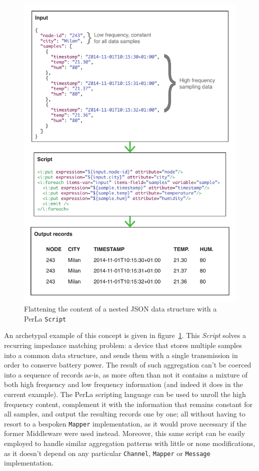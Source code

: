 \begin{figure}[h!]
    \centering
    \includegraphics[scale=0.8]{imgs/script_unrolling.pdf}
    \caption{Flattening the content of a nested JSON data structure with a
    PerLa \texttt{Script}}
    \label{fig:script_unrolling}
\end{figure}

An archetypal example of this concept is given in
figure~\ref{fig:script_unrolling}. This \textit{Script} solves a recurring
impedance matching problem: a device that stores multiple samples into a common
data structure, and sends them with a single transmission in order to conserve
battery power. The result of such aggregation can't be coerced into a sequence
of records as-is, as more often than not it contains a mixture of both high
frequency and low frequency information (and indeed it does in the current
example). The PerLa scripting language can be used to unroll the high frequency
content, complement it with the information that remains constant for all
samples, and output the resulting records one by one; all without having to
resort to a bespoken \texttt{Mapper} implementation, as it would prove
necessary if the former Middleware were used instead. Moreover, this same
script can be easily employed to handle similar aggregation patterns with
little or none modifications, as it doesn't depend on any particular
\texttt{Channel}, \texttt{Mapper} or \texttt{Message} implementation.

